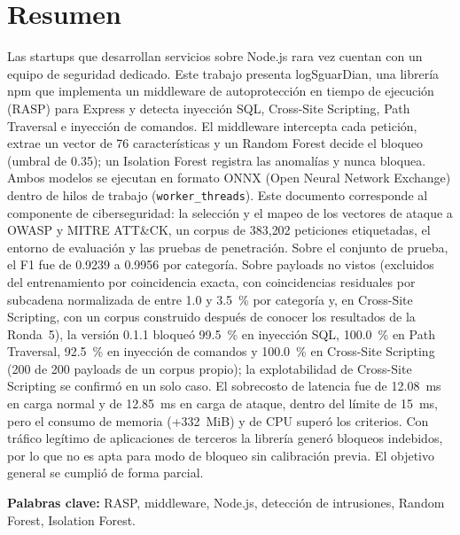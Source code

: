 \ifdefined\modoensamble
\else
	
	\chapter*{Resumen}
\fi

Las startups que desarrollan servicios sobre Node.js rara vez cuentan con un equipo de seguridad dedicado. Este trabajo presenta logSguarDian, una librería npm que implementa un middleware de autoprotección en tiempo de ejecución (RASP) para Express y detecta inyección SQL, Cross-Site Scripting, Path Traversal e inyección de comandos. El middleware intercepta cada petición, extrae un vector de 76 características y un Random Forest decide el bloqueo (umbral de 0.35); un Isolation Forest registra las anomalías y nunca bloquea. Ambos modelos se ejecutan en formato ONNX (Open Neural Network Exchange) dentro de hilos de trabajo (\texttt{worker\_threads}). Este documento corresponde al componente de ciberseguridad: la selección y el mapeo de los vectores de ataque a OWASP y MITRE ATT\&CK, un corpus de 383{,}202 peticiones etiquetadas, el entorno de evaluación y las pruebas de penetración. Sobre el conjunto de prueba, el F1 fue de 0.9239 a 0.9956 por categoría. Sobre payloads no vistos (excluidos del entrenamiento por coincidencia exacta, con coincidencias residuales por subcadena normalizada de entre 1.0 y 3.5~\% por categoría y, en Cross-Site Scripting, con un corpus construido después de conocer los resultados de la Ronda~5), la versión 0.1.1 bloqueó 99.5~\% en inyección SQL, 100.0~\% en Path Traversal, 92.5~\% en inyección de comandos y 100.0~\% en Cross-Site Scripting (200 de 200 payloads de un corpus propio); la explotabilidad de Cross-Site Scripting se confirmó en un solo caso. El sobrecosto de latencia fue de 12.08~ms en carga normal y de 12.85~ms en carga de ataque, dentro del límite de 15~ms, pero el consumo de memoria (+332~MiB) y de CPU superó los criterios. Con tráfico legítimo de aplicaciones de terceros la librería generó bloqueos indebidos, por lo que no es apta para modo de bloqueo sin calibración previa. El objetivo general se cumplió de forma parcial.

\medskip
\noindent\textbf{Palabras clave:} RASP, middleware, Node.js, detección de intrusiones, Random Forest, Isolation Forest.

\ifdefined\modoensamble
\else
	
\fi
